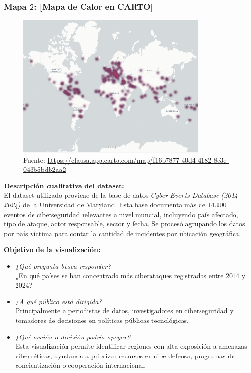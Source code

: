 \documentclass[12pt, a4paper]{article}
\begin{document}
\subsubsection*{Mapa 2: [Mapa de Calor en CARTO]}
\begin{figure}[H]
    \centering
    \includegraphics[width=0.85\textwidth]{images/Mapa_calor_FC.png}
    \caption[1]{Fuente: \url{https://clausa.app.carto.com/map/f16b7877-40d4-4182-8c3e-043b5bdb2aa2}}
\end{figure}

\textbf{Descripción cualitativa del dataset:} \\
El dataset utilizado proviene de la base de datos \textit{Cyber Events Database (2014–2024)} de la Universidad de Maryland. Esta base documenta más de 14.000 eventos de ciberseguridad relevantes a nivel mundial, incluyendo país afectado, tipo de ataque, actor responsable, sector y fecha. Se procesó agrupando los datos por país víctima para contar la cantidad de incidentes por ubicación geográfica.

\vspace{0.5em}
\textbf{Objetivo de la visualización:} \\
\begin{itemize}
    \item \textit{¿Qué pregunta busca responder?} \\
    ¿En qué países se han concentrado más ciberataques registrados entre 2014 y 2024?
    
    \item \textit{¿A qué público está dirigida?} \\
    Principalmente a periodistas de datos, investigadores en ciberseguridad y tomadores de decisiones en políticas públicas tecnológicas.

    \item \textit{¿Qué acción o decisión podría apoyar?} \\
    Esta visualización permite identificar regiones con alta exposición a amenazas cibernéticas, ayudando a priorizar recursos en ciberdefensa, programas de concientización o cooperación internacional.
\end{itemize}
\end{document}
